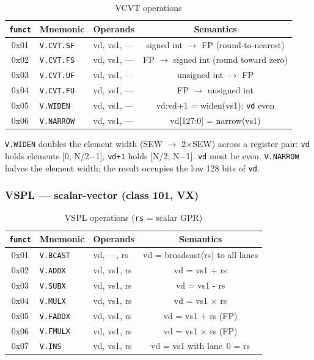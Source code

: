 \documentclass[11pt,a4paper]{article}
\begin{document}
\begin{table}[H]
\centering
\caption{VCVT operations}
\begin{tabular}{cllc}
\toprule
{\tt funct} & Mnemonic & Operands & Semantics \\
\midrule
0x01 & {\tt V.CVT.SF} & vd, vs1, --- & signed int $\rightarrow$ FP (round-to-nearest) \\
0x02 & {\tt V.CVT.FS} & vd, vs1, --- & FP $\rightarrow$ signed int (round toward zero) \\
0x03 & {\tt V.CVT.UF} & vd, vs1, --- & unsigned int $\rightarrow$ FP \\
0x04 & {\tt V.CVT.FU} & vd, vs1, --- & FP $\rightarrow$ unsigned int \\
0x05 & {\tt V.WIDEN}  & vd, vs1, --- & vd:vd+1 = widen(vs1); {\tt vd} even \\
0x06 & {\tt V.NARROW} & vd, vs1, --- & vd[127:0] = narrow(vs1) \\
\bottomrule
\end{tabular}
\end{table}

{\tt V.WIDEN} doubles the element width (SEW $\rightarrow$ 2$\times$SEW) across a
register pair: {\tt vd} holds elements [0, N/2$-$1], {\tt vd+1} holds
[N/2, N$-$1]. {\tt vd} must be even. {\tt V.NARROW} halves the element width;
the result occupies the low 128 bits of {\tt vd}.

\subsubsection*{VSPL --- scalar-vector (class 101, VX)}

\begin{table}[H]
\centering
\caption{VSPL operations ({\tt rs} = scalar GPR)}
\begin{tabular}{cllc}
\toprule
{\tt funct} & Mnemonic & Operands & Semantics \\
\midrule
0x01 & {\tt V.BCAST} & vd, ---, rs & vd = broadcast(rs) to all lanes \\
0x02 & {\tt V.ADDX}  & vd, vs1, rs & vd = vs1 + rs \\
0x03 & {\tt V.SUBX}  & vd, vs1, rs & vd = vs1 - rs \\
0x04 & {\tt V.MULX}  & vd, vs1, rs & vd = vs1 $\times$ rs \\
0x05 & {\tt V.FADDX} & vd, vs1, rs & vd = vs1 + rs (FP) \\
0x06 & {\tt V.FMULX} & vd, vs1, rs & vd = vs1 $\times$ rs (FP) \\
0x07 & {\tt V.INS}   & vd, vs1, rs & vd = vs1 with lane~0 = rs \\
\bottomrule
\end{tabular}
\end{table}
\end{document}
